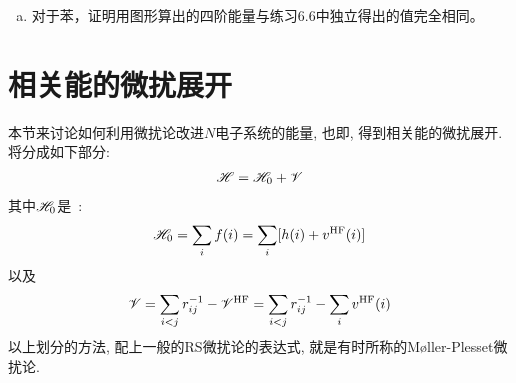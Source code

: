 {\begin{enumerate}[a.]
\begin{equation*}
\begin{tikzpicture}[baseline={(current bounding box.center)}, postaction={on each segment={mid arrow}},scale=.6]
		arc (45:-15:2.12cm)node[right,midway]{a} node{\tikz{\filldraw[blue](0,0)circle(1pt)}} arc(-15:-45:2.12cm)node[right,midway]{b};
		\end{tikzpicture}
		=
		\frac{N\beta}{64}
		\end{equation*}
		以及
		\begin{equation*}
		\begin{tikzpicture}[baseline={(current bounding box.center)}, postaction={on each segment={mid arrow}},scale=.6]
			\path [draw=blue,postaction={on each segment={mid arrow}}]
			(8,-7.) node{\tikz{\filldraw[blue](0,0)circle(1pt)}}
			arc (-45:15:2.12cm)node[right,midway]{r} node{\tikz{\filldraw[blue](0,0)circle(1pt)}} arc(-15:-45:2.12cm)node[left,midway]{b} node{\tikz{\filldraw[blue](0,0)circle(1pt)}} arc(225:180:2.57cm)node[right,midway]{s} node{\tikz{\filldraw[blue](0,0)circle(1pt)}} to [bend right] node[left,midway]{s} (8,-7.);
		\end{tikzpicture}
		=
		\begin{tikzpicture}[baseline={(current bounding box.center)}, postaction={on each segment={mid arrow}},scale=.6]
		\path [draw=blue,postaction={on each segment={mid reverse arrow}}]
		(10,-7.) node{\tikz{\filldraw[blue](0,0)circle(1pt)}}
		arc (-45:15:2.12cm)node[right,midway]{r} node{\tikz{\filldraw[blue](0,0)circle(1pt)}} arc(-15:-45:2.12cm)node[left,midway]{b} node{\tikz{\filldraw[blue](0,0)circle(1pt)}} arc(225:180:2.57cm)node[right,midway]{s} node{\tikz{\filldraw[blue](0,0)circle(1pt)}} to [bend right] node[left,midway]{s} (10,-7.);
		\draw (12,-5.5)node{$n=4$};
		\end{tikzpicture}
		=-\frac{3N\beta}{128}
		\end{equation*}
		继而有
		\begin{equation*}
		E_0^{(4)} = \frac{N\beta}{64}
		\end{equation*}
		因此环多烯（$N>6$）的共振能算到第四阶就是$(1/4+1/64)N\beta=0.2656 N\beta$, 和渐近的精确值$0.2732\beta$相比非常接近（占97\%）。
	\item 对于苯，证明用图形算出的四阶能量与练习6.6中独立得出的值完全相同。
\end{enumerate}
}


\section{相关能的微扰展开}
本节来讨论如何利用微扰论改进$N$电子系统的\hft 能量, 也即, 得到相关能的微扰展开. 将\ha 分成如下部分:
\begin{align}
\mathscr{H}=\mathscr{H}_0+\mathscr{V}
\end{align} 
其中$\mathscr{H}_0$是\hft\ \ha:
\begin{align}
\mathscr{H}_0=\sum_{i} f(i) = \sum_{i}[h(i)+v^\mathrm{HF}(i)]
\end{align}
以及
\begin{align}
\mathscr{V} = \sum_{i<j}r_{ij}^{-1} - \mathscr{V}^\mathrm{HF} =  \sum_{i<j}r_{ij}^{-1} - \sum_{i}v^\mathrm{HF}(i)
\end{align}
以上划分\ha 的方法, 配上一般的RS微扰论的表达式, 就是有时所称的{M{\o}ller-Plesset}微扰论.

